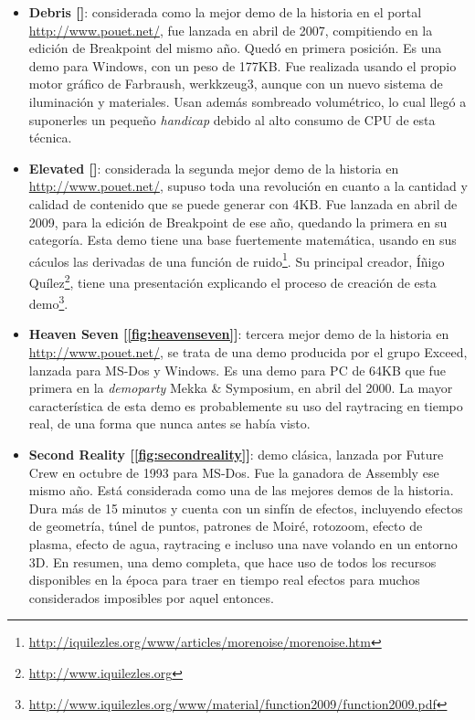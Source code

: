 \begin{itemize}
	\item \textbf{Debris [\pageref{fig:debris}]}: considerada como la mejor demo de la historia en el portal \url{http://www.pouet.net/}, fue lanzada en abril de 2007, compitiendo en la edición de Breakpoint del mismo año. Quedó en primera posición. Es una demo para Windows, con un peso de 177KB. Fue realizada usando el propio motor gráfico de Farbraush, werkkzeug3, aunque con un nuevo sistema de iluminación y materiales. Usan además sombreado volumétrico, lo cual llegó a suponerles un pequeño \emph{handicap} debido al alto consumo de CPU de esta técnica.
	\item \textbf{Elevated [\pageref{fig:elevated}]}: considerada la segunda mejor demo de la historia en \url{http://www.pouet.net/}, supuso toda una revolución en cuanto a la cantidad y calidad de contenido que se puede generar con 4KB. Fue lanzada en abril de 2009, para la edición de Breakpoint de ese año, quedando la primera en su categoría. Esta demo tiene una base fuertemente matemática, usando en sus cáculos las derivadas de una función de ruido\footnote{\url{http://iquilezles.org/www/articles/morenoise/morenoise.htm}}. Su principal creador, Íñigo Quílez\footnote{\url{http://www.iquilezles.org}}, tiene una presentación explicando el proceso de creación de esta demo\footnote{\url{http://www.iquilezles.org/www/material/function2009/function2009.pdf}}.
	\item \textbf{Heaven Seven [\ref{fig:heavenseven}]}: tercera mejor demo de la historia en \url{http://www.pouet.net/}, se trata de una demo producida por el grupo Exceed, lanzada para MS-Dos y Windows. Es una demo para PC de 64KB que fue primera en la \emph{demoparty} Mekka \& Symposium, en abril del 2000. La mayor característica de esta demo es probablemente su uso del raytracing en tiempo real, de una forma que nunca antes se había visto.
	\item \textbf{Second Reality [\ref{fig:secondreality}]}: demo clásica, lanzada por Future Crew en octubre de 1993 para MS-Dos. Fue la ganadora de Assembly ese mismo año. Está considerada como una de las mejores demos de la historia. Dura más de 15 minutos y cuenta con un sinfín de efectos, incluyendo efectos de geometría, túnel de puntos, patrones de Moiré, rotozoom, efecto de plasma, efecto de agua, raytracing e incluso una nave volando en un entorno 3D. En resumen, una demo completa, que hace uso de todos los recursos disponibles en la época para traer en tiempo real efectos para muchos considerados imposibles por aquel entonces. 

\end{itemize}
